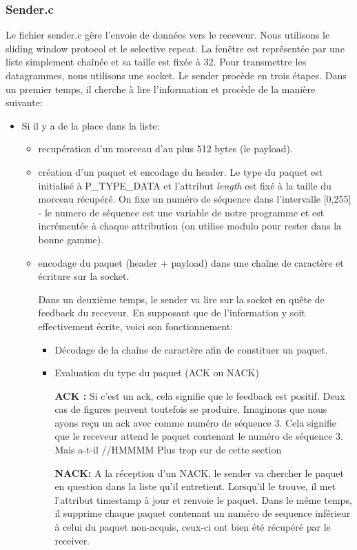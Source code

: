 \subsubsection{Sender.c}
Le fichier sender.c gère l'envoie de données vers le receveur. Nous utilisons le sliding window protocol et le selective
repeat. La fenêtre est représentée par une liste simplement chaînée et sa taille est fixée à 32. Pour transmettre les
datagrammes, nous utilisons une socket.
Le sender procède en trois étapes. Dans un premier temps, il cherche à lire l'information et procède de la manière suivante:
\begin{itemize}
  \item Si il y a de la place dans la liste:
    \begin{itemize}
      \item recupération d'un morceau d'au plus 512 bytes (le payload).
      \item création d'un paquet et encodage du header. Le type du paquet est initialisé à P_TYPE_DATA et l'attribut
      \textit{length} est fixé à la taille du morceau récupéré. On fixe un numéro de séquence dans l'intervalle [0,255] -
      le numero de séquence est une variable de notre programme et est incrémentée à chaque attribution (on utilise modulo
      pour rester dans la bonne gamme).
      \item encodage du paquet (header + payload) dans une chaîne de caractère et écriture sur la socket.

Dans un deuxième temps, le sender va lire sur la socket en quête de feedback du receveur. En supposant que de l'information
y soit effectivement écrite, voici son fonctionnement:

\begin{itemize}
  \item Décodage de la chaîne de caractère afin de constituer un paquet.
  \item Evaluation du type du paquet (ACK ou NACK)

    \textbf{ACK :} Si c'est un ack, cela signifie que le feedback est positif. Deux cas de figures peuvent toutefois se
    produire. Imaginons que nous ayons reçu un ack avec comme numéro de séquence 3. Cela signifie que le receveur attend
    le paquet contenant le numéro de séquence 3. Mais a-t-il
    //HMMMM Plus trop sur de cette section

    \textbf{NACK:} A la réception d'un NACK, le sender va chercher le paquet en question dans la liste qu'il entretient.
      Lorsqu'il le trouve, il met l'attribut timestamp à jour et renvoie le paquet. Dans le même temps, il supprime chaque
      paquet contenant un numéro de sequence inférieur à celui du paquet non-acquis, ceux-ci ont bien été récupéré par le
      receiver.


\end{itemize}
\end{itemize}
\end{itemize}
